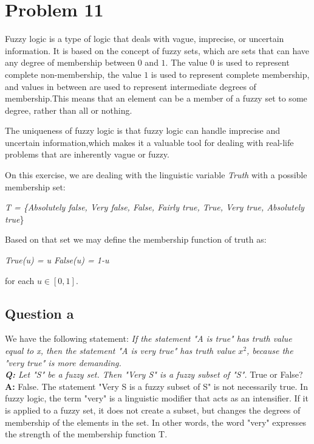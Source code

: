 \section{Problem 11}

Fuzzy logic is a type of logic that deals with vague, imprecise, or uncertain information. It is based on the concept of fuzzy sets, which are sets that can have any degree of membership between $0$ and $1$.  The value $0$ is used to represent complete non-membership, the value $1$ is used to represent complete membership, and values in between are used to represent intermediate degrees of membership.This means that an element can be a member of a fuzzy set to some degree, rather than all or nothing.

The uniqueness of fuzzy logic is that fuzzy logic can handle imprecise and uncertain information,which makes it a valuable tool for dealing with real-life problems that are inherently vague or fuzzy. 

On this exercise, we are dealing with the linguistic variable \textit{Truth} with a possible membership set: 

\begin{center}
	\textit {T = \{Absolutely false, Very false, False, Fairly true, True, Very true, Absolutely true}\}
\end{center}

Based on that set we may define the membership function of truth as:
\begin{center}
	\textit{True(u) = u \hspace{3mm}  False(u) = 1-u}
\end{center}
for each $u \in [0, 1]$.

\subsection{Question a}
We have the following statement: \textit{If the statement "A is true" has truth value equal to x, then the statement "A is very true" has truth value $x^2$, because the "very true" is more demanding.\\
\textbf{Q: }Let "S" be a fuzzy set. Then "Very S" is a fuzzy subset of "S".} True or False?\\
\textbf{A: }False. The statement "Very S is a fuzzy subset of S" is not necessarily true. In fuzzy logic, the term "very" is a linguistic modifier that acts as an intensifier. If it is applied to a fuzzy set, it does not create a subset, but changes the degrees of membership of the elements in the set. In other words, the word "very" expresses the strength of the membership function T.
